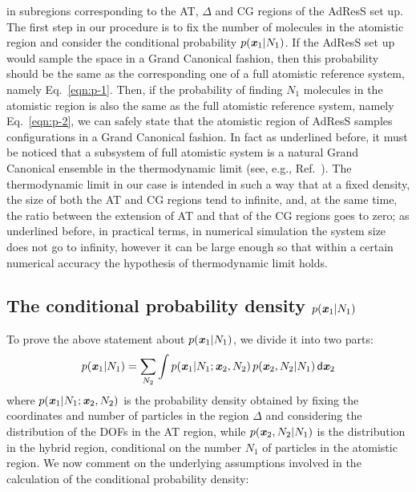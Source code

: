 \documentclass[aps,a4paper,reprint,onecolumn]{revtex4}
\newcommand{\vect}[1]{\textbf{\textit{#1}}}
\newcommand{\dd}[1]{\textsf{#1}}
\newcommand{\HY}{{\Delta}}
\begin{document}
in subregions corresponding to the AT, $\HY$ and CG regions of the AdResS
set up. The first step in our procedure is to fix the number of molecules in the atomistic
region and consider the conditional probability $p(\vect x_1 |
N_1)$. If the AdResS set up would sample the space in a Grand Canonical fashion, then this
probability should be the same as the corresponding one of a full
atomistic reference system, namely Eq.~\eqref{eqn:p-1}.  Then, if the
probability of finding $N_1$ molecules in the atomistic region is also
the same as the full atomistic reference system, namely
Eq.~\eqref{eqn:p-2}, we can safely state that the atomistic region of AdResS
samples configurations in a Grand Canonical fashion. In fact as underlined before, it must be noticed that a subsystem of full atomistic system is a natural Grand Canonical ensemble in the thermodynamic limit (see, e.g., Ref.~). 
The thermodynamic limit in our case is intended in such a way that at a fixed density, the size of
  both the AT and CG regions tend to infinite, and, at the same time,
  the ratio between the extension of AT and that of the CG regions goes to zero; as underlined before, in practical terms, in numerical simulation the system size does not go to infinity, however it can be large enough so that within a certain numerical accuracy the hypothesis of thermodynamic limit holds.


\subsection{The conditional probability density $p(\vect x_1 | N_1)$}  \label{sec:p-1}

%
To prove the above statement about $p(\vect x_1 | N_1)$, we divide it into two parts:
\begin{align}\label{eqn:divide-cond-p}
  p(\vect x_1 | N_1) = \sum_{N_2}\int
  p(\vect x_1 | N_1; \vect x_2, N_2) \,
  p(\vect x_2, N_2 | N_1)
  \,\dd d\vect x_2
\end{align}
where $p(\vect x_1 | N_1; \vect x_2, N_2)$ is the probability density obtained by fixing the
coordinates and number of particles in the region $\HY$ and considering
the distribution of the DOFs in the AT region, while $p(\vect x_2, N_2 | N_1)$ is the distribution in the hybrid region, conditional on the number $N_{1}$ of particles in the atomistic region. We now comment on the underlying assumptions involved in the calculation of the conditional probability density: 
\end{document}
